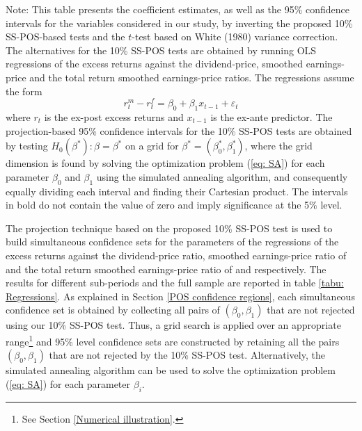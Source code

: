 \documentclass[harvard,11pt]{article}
\begin{document}
\begin{table}[hbtp!]
\begin{minipage}{\linewidth}
\vspace{1pt}
Note: This table presents the coefficient estimates, as well as the 95\% confidence intervals for the variables considered in our study, by inverting the proposed 10\% SS-POS-based tests and the $t$-test based on White (1980) variance correction. The alternatives for the 10\% SS-POS tests are obtained by running OLS regressions of the excess returns against the dividend-price, smoothed earnings-price and the total return smoothed earnings-price ratios. The regressions assume the form 
\begin{equation}\label{eq: Regressions}
r_t^m-r_t^f=\beta_0+\beta_1 x_{t-1}+\varepsilon_t
\end{equation}
where $r_t$ is the ex-post excess returns and $x_{t-1}$ is the ex-ante predictor. The projection-based 95\% confidence intervals for the 10\% SS-POS tests are obtained by testing $H_0(\beta^{*}):\beta=\beta^{*}$ on a grid for $\beta^{*}=(\beta_0^{*},\beta_1^{*})$, where the grid dimension is found by solving the optimization problem (\ref{eq: SA}) for each parameter $\beta_0$ and $\beta_1$ using the simulated annealing algorithm, and consequently equally dividing each interval and finding their Cartesian product. The intervals in bold do not contain the value of zero and imply significance at the 5\% level.
\end{minipage}
\end{table}


The projection technique based on the proposed 10\% SS-POS test is used to build simultaneous confidence sets for the parameters of the regressions of the excess returns against the
dividend-price ratio, smoothed earnings-price ratio of \citet{campbell1988dividend} and the total return smoothed earnings-price ratio of \citet{bunn2014cape} and \citet{jivraj2017many} respectively. The results for different sub-periods and the full sample are reported in table \ref{tabu: Regressions}. As explained in Section \ref{POS confidence regions}, each simultaneous confidence set is obtained by
collecting all pairs of $(\beta_0 ,\beta_1 )$ that are not rejected using our 10\% SS-POS test. Thus, a grid search is applied over an appropriate range\footnote{See Section \ref{Numerical illustration}.} and 95\% level confidence sets are constructed by retaining all the pairs $(\beta_0 ,\beta_1 )$ that are not
rejected by the 10\% SS-POS test. Alternatively, the simulated annealing algorithm can be used to solve the optimization problem (\ref{eq: SA}) for each parameter $\beta_i$. 
\end{document}
